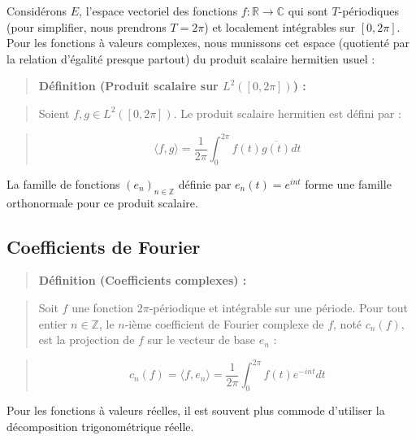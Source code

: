 \documentclass[12pt,a4paper]{article}
\begin{document}
Considérons $E$, l'espace vectoriel des fonctions $f : \mathbb{R} \to \mathbb{C}$ qui sont $T$-périodiques (pour simplifier, nous prendrons $T = 2\pi$) et localement intégrables sur $[0, 2\pi]$. Pour les fonctions à valeurs complexes, nous munissons cet espace (quotienté par la relation d'égalité presque partout) du produit scalaire hermitien usuel :

\begin{quote}
\textbf{Définition (Produit scalaire sur $L^2([0, 2\pi])$) :}
\end{quote}
\begin{quote}
Soient $f, g \in L^2([0, 2\pi])$. Le produit scalaire hermitien est défini par :
\end{quote}
\begin{quote}
$$\langle f, g \rangle = \frac{1}{2\pi} \int_0^{2\pi} f(t) \overline{g(t)} dt$$
\end{quote}

La famille de fonctions $(e_n)_{n \in \mathbb{Z}}$ définie par $e_n(t) = e^{int}$ forme une famille orthonormale pour ce produit scalaire.

\subsection{Coefficients de Fourier}

\begin{quote}
\textbf{Définition (Coefficients complexes) :}
\end{quote}
\begin{quote}
Soit $f$ une fonction $2\pi$-périodique et intégrable sur une période. Pour tout entier $n \in \mathbb{Z}$, le $n$-ième coefficient de Fourier complexe de $f$, noté $c_n(f)$, est la projection de $f$ sur le vecteur de base $e_n$ :
\end{quote}
\begin{quote}
$$c_n(f) = \langle f, e_n \rangle = \frac{1}{2\pi} \int_0^{2\pi} f(t) e^{-int} dt$$
\end{quote}

Pour les fonctions à valeurs réelles, il est souvent plus commode d'utiliser la décomposition trigonométrique réelle.
\end{document}
